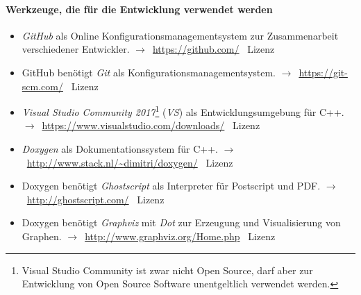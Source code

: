 \documentclass[english,ngerman,parskip=half,headsepline,footsepline]{scrreprt}
\newcounter{Enumi}
\begin{document}
	\paragraph{Werkzeuge, die für die Entwicklung verwendet werden}
	\begin{itemize}
		\setcounter{enumi}{\value{Enumi}}

		\item\label{Werkzeug:GitHub}\emph{GitHub} als Online Konfigurationsmanagementsystem zur Zusammenarbeit verschiedener Entwickler. $\rightarrow$~\url{https://github.com/} \textendash\ Lizenz~\cite{bib:GPLii}

		\item\label{Werkzeug:Git}GitHub benötigt \emph{Git} als Konfigurationsmanagementsystem. $\rightarrow$~\url{https://git-scm.com/} \textendash\ Lizenz~\cite{bib:GPLii}

		\item\label{Werkzeug:VSC}\emph{Visual Studio Community 2017}\footnote{ Visual Studio Community ist zwar nicht Open Source, darf aber zur Entwicklung von Open Source Software unentgeltlich verwendet werden.} (\emph{VS}) als Entwicklungsumgebung für C++. $\rightarrow$~\url{https://www.visualstudio.com/downloads/} \textendash\ Lizenz~\cite{bib:EULA}

		\item\label{Werkzeug:Doxygen}\emph{Doxygen} als Dokumentationssystem für C++. $\rightarrow$~\url{http://www.stack.nl/~dimitri/doxygen/} \textendash\ Lizenz~\cite{bib:GPLii}

		\item\label{Werkzeug:Ghostscript}Doxygen benötigt \emph{Ghostscript} als Interpreter für Postscript und PDF. $\rightarrow$~\url{http://ghostscript.com/} \textendash\ Lizenz~\cite{bib:AGPL}

		\item\label{Werkzeug:Graphviz}Doxygen benötigt \emph{Graphviz} mit \emph{Dot} zur Erzeugung und Visualisierung von Graphen. $\rightarrow$~\url{http://www.graphviz.org/Home.php} \textendash\ Lizenz~\cite{bib:EPL}

		\setcounter{Enumi}{\value{enumi}}
	\end{itemize}
\end{document}
